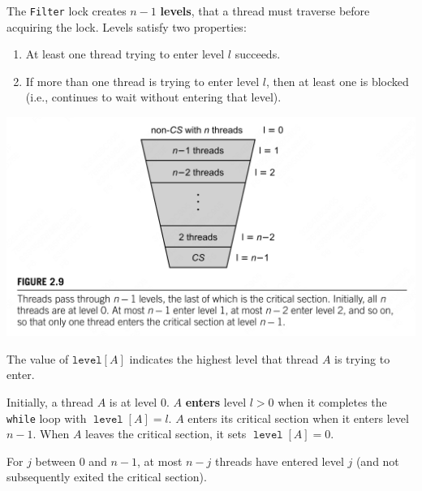 \documentclass[11pt]{article}
\DeclareMathOperator{\tlevel}{\texttt{level}}
\begin{document}
The \texttt{Filter} lock creates \(n-1\) \textbf{levels}, that a thread must traverse before acquiring the lock. Levels
satisfy two properties:
\begin{enumerate}
\item At least one thread trying to enter level \(l\) succeeds.
\item If more than one thread is trying to enter level \(l\), then at least one is blocked (i.e.,
continues to wait without entering that level).
\end{enumerate}

\begin{center}
\includegraphics[width=.9\textwidth]{../images/ArtOfMulti/1.png}
\label{}
\end{center}
The value of \(\texttt{level}[A]\) indicates the highest level that thread \(A\) is trying to enter.

Initially, a thread \(A\) is at level 0. \(A\) \textbf{enters} level \(l>0\) when it completes the \texttt{while} loop
with \(\tlevel[A]=l\). \(A\) enters its critical section when it enters level \(n-1\). When \(A\)
leaves the critical section, it sets \(\tlevel[A]=0\).

\begin{lemma}[]
For \(j\) between \(0\) and \(n-1\), at most \(n-j\) threads have entered level \(j\) (and not
subsequently exited the critical section).
\end{lemma}
\end{document}
